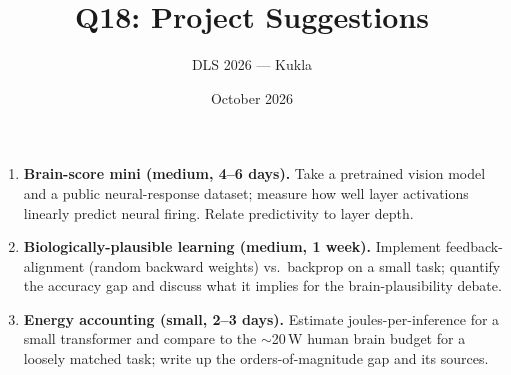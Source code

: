 \documentclass[11pt]{article}
\title{Q18: Project Suggestions}
\author{DLS 2026 --- Kukla}
\date{October 2026}
\begin{document}
\maketitle
\begin{enumerate}[leftmargin=1.5em]
\item \textbf{Brain-score mini (medium, 4--6 days).} Take a pretrained vision model and a public neural-response dataset; measure how well layer activations linearly predict neural firing. Relate predictivity to layer depth.
\item \textbf{Biologically-plausible learning (medium, 1 week).} Implement feedback-alignment (random backward weights) vs.\ backprop on a small task; quantify the accuracy gap and discuss what it implies for the brain-plausibility debate.
\item \textbf{Energy accounting (small, 2--3 days).} Estimate joules-per-inference for a small transformer and compare to the $\sim$20\,W human brain budget for a loosely matched task; write up the orders-of-magnitude gap and its sources.
\end{enumerate}
\end{document}
